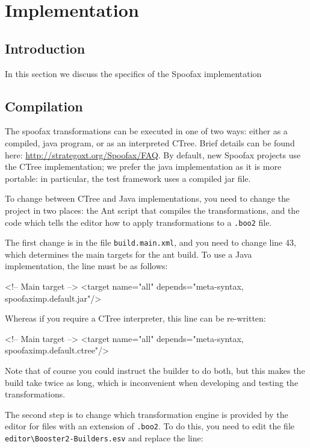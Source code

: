 \chapter{Implementation}

\section{Introduction}

In this section we discuss the specifics of the Spoofax implementation

\section{Compilation}

The spoofax transformations can be executed in one of two ways: either
as a compiled, java program, or as an interpreted CTree.  Brief details
can be found here: \url{http://strategoxt.org/Spoofax/FAQ}.  By
default, new Spoofax projects use the CTree implementation; we prefer
the java implementation as it is more portable: in particular, the
test framework uses a compiled jar file.

To change between CTree and Java implementations, you need to change
the project in two places: the Ant script that compiles the
transformations, and the code which tells the editor how to apply
transformations to a \verb|.boo2| file.

The first change is in the file \verb|build.main.xml|, and you need to
change line 43, which determines the main targets for the ant build.
To use a Java implementation, the line must be as follows:
\begin{code}
<!-- Main target -->
<target name="all" depends="meta-syntax, spoofaximp.default.jar"/>
\end{code}

Whereas if you require a CTree interpreter, this line can be
re-written:

\begin{code}
<!-- Main target -->
<target name="all" depends="meta-syntax, spoofaximp.default.ctree"/>
\end{code}

Note that of course you could instruct the builder to do both, but
this makes the build take twice as long, which is inconvenient when
developing and testing the transformations.

The second step is to change which transformation engine is provided
by the editor for files with an extension of \verb|.boo2|.  To do
this, you need to edit the file \verb|editor\Booster2-Builders.esv|
and replace the line:

